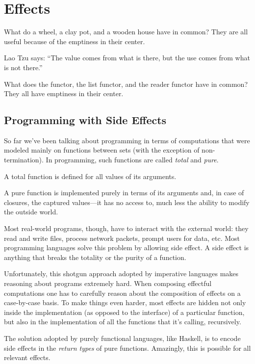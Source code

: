 \documentclass[DaoFP]{subfiles}
\begin{document}
\setcounter{chapter}{12}

\chapter{Effects}

What do a wheel, a clay pot, and a wooden house have in common? They are all useful because of the emptiness in their center. 

Lao Tzu says: ``The value comes from what is there, but the use comes from what is not there.''

What does the  functor, the list functor, and the reader functor have in common? They all have emptiness in their center. 

\section{Programming with Side Effects}

So far we've been talking about programming in terms of computations that were modeled mainly on functions between sets (with the exception of non-termination). In programming, such functions are called \emph{total} and \emph{pure}. 

A total function is defined for all values of its arguments. 

A pure function is implemented purely in terms of its arguments and, in case of closures, the captured values---it has no access to, much less the ability to modify the outside world. 

Most real-world programs, though, have to interact with the external world: they read and write files, process network packets, prompt users for data, etc. Most programming languages solve this problem by allowing side effect. A side effect is anything that breaks the totality or the purity of a function. 

Unfortunately, this shotgun approach adopted by imperative languages makes reasoning about programs extremely hard. When composing effectful computations one has to carefully reason about the composition of effects on a case-by-case basis. To make things even harder, most effects are hidden not only inside the implementation (as opposed to the interface) of a particular function, but also in the implementation of all the functions that it's calling, recursively.

The solution adopted by purely functional languages, like Haskell, is to encode side effects in the \emph{return types} of pure functions. Amazingly, this is possible for all relevant effects. 
\end{document}
